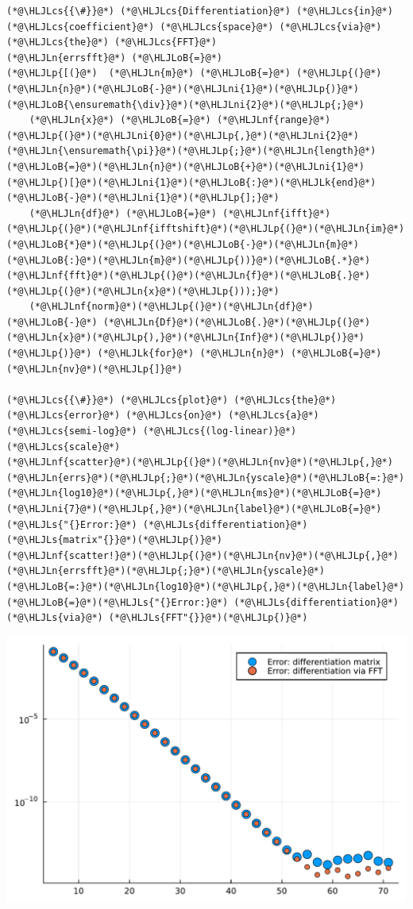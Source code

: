 \documentclass[12pt,landscape]{article}
\newcommand{\HLJLk}[1]{\textcolor[RGB]{148,91,176}{\textbf{#1}}}
\newcommand{\HLJLn}[1]{#1}
\newcommand{\HLJLnf}[1]{\textcolor[RGB]{66,102,213}{#1}}
\newcommand{\HLJLs}[1]{\textcolor[RGB]{201,61,57}{#1}}
\newcommand{\HLJLni}[1]{\textcolor[RGB]{59,151,46}{#1}}
\newcommand{\HLJLoB}[1]{\textcolor[RGB]{102,102,102}{\textbf{#1}}}
\newcommand{\HLJLp}[1]{#1}
\newcommand{\HLJLcs}[1]{\textcolor[RGB]{153,153,119}{\textit{#1}}}
\begin{document}
{\begin{lstlisting}
(*@\HLJLcs{{\#}}@*) (*@\HLJLcs{Differentiation}@*) (*@\HLJLcs{in}@*) (*@\HLJLcs{coefficient}@*) (*@\HLJLcs{space}@*) (*@\HLJLcs{via}@*) (*@\HLJLcs{the}@*) (*@\HLJLcs{FFT}@*)
(*@\HLJLn{errsfft}@*) (*@\HLJLoB{=}@*) 
(*@\HLJLp{[(}@*)  (*@\HLJLn{m}@*) (*@\HLJLoB{=}@*) (*@\HLJLp{(}@*)(*@\HLJLn{n}@*)(*@\HLJLoB{-}@*)(*@\HLJLni{1}@*)(*@\HLJLp{)}@*)(*@\HLJLoB{\ensuremath{\div}}@*)(*@\HLJLni{2}@*)(*@\HLJLp{;}@*)
    (*@\HLJLn{x}@*) (*@\HLJLoB{=}@*) (*@\HLJLnf{range}@*)(*@\HLJLp{(}@*)(*@\HLJLni{0}@*)(*@\HLJLp{,}@*)(*@\HLJLni{2}@*)(*@\HLJLn{\ensuremath{\pi}}@*)(*@\HLJLp{;}@*)(*@\HLJLn{length}@*)(*@\HLJLoB{=}@*)(*@\HLJLn{n}@*)(*@\HLJLoB{+}@*)(*@\HLJLni{1}@*)(*@\HLJLp{)[}@*)(*@\HLJLni{1}@*)(*@\HLJLoB{:}@*)(*@\HLJLk{end}@*)(*@\HLJLoB{-}@*)(*@\HLJLni{1}@*)(*@\HLJLp{];}@*)
    (*@\HLJLn{df}@*) (*@\HLJLoB{=}@*) (*@\HLJLnf{ifft}@*)(*@\HLJLp{(}@*)(*@\HLJLnf{ifftshift}@*)(*@\HLJLp{(}@*)(*@\HLJLn{im}@*)(*@\HLJLoB{*}@*)(*@\HLJLp{(}@*)(*@\HLJLoB{-}@*)(*@\HLJLn{m}@*)(*@\HLJLoB{:}@*)(*@\HLJLn{m}@*)(*@\HLJLp{))}@*)(*@\HLJLoB{.*}@*)(*@\HLJLnf{fft}@*)(*@\HLJLp{(}@*)(*@\HLJLn{f}@*)(*@\HLJLoB{.}@*)(*@\HLJLp{(}@*)(*@\HLJLn{x}@*)(*@\HLJLp{)));}@*)
    (*@\HLJLnf{norm}@*)(*@\HLJLp{(}@*)(*@\HLJLn{df}@*) (*@\HLJLoB{-}@*) (*@\HLJLn{Df}@*)(*@\HLJLoB{.}@*)(*@\HLJLp{(}@*)(*@\HLJLn{x}@*)(*@\HLJLp{),}@*)(*@\HLJLn{Inf}@*)(*@\HLJLp{)}@*) (*@\HLJLp{)}@*) (*@\HLJLk{for}@*) (*@\HLJLn{n}@*) (*@\HLJLoB{=}@*) (*@\HLJLn{nv}@*)(*@\HLJLp{]}@*)

(*@\HLJLcs{{\#}}@*) (*@\HLJLcs{plot}@*) (*@\HLJLcs{the}@*) (*@\HLJLcs{error}@*) (*@\HLJLcs{on}@*) (*@\HLJLcs{a}@*) (*@\HLJLcs{semi-log}@*) (*@\HLJLcs{(log-linear)}@*) (*@\HLJLcs{scale}@*)
(*@\HLJLnf{scatter}@*)(*@\HLJLp{(}@*)(*@\HLJLn{nv}@*)(*@\HLJLp{,}@*)(*@\HLJLn{errs}@*)(*@\HLJLp{;}@*)(*@\HLJLn{yscale}@*)(*@\HLJLoB{=:}@*)(*@\HLJLn{log10}@*)(*@\HLJLp{,}@*)(*@\HLJLn{ms}@*)(*@\HLJLoB{=}@*)(*@\HLJLni{7}@*)(*@\HLJLp{,}@*)(*@\HLJLn{label}@*)(*@\HLJLoB{=}@*)(*@\HLJLs{"{}Error:}@*) (*@\HLJLs{differentiation}@*) (*@\HLJLs{matrix"{}}@*)(*@\HLJLp{)}@*)
(*@\HLJLnf{scatter!}@*)(*@\HLJLp{(}@*)(*@\HLJLn{nv}@*)(*@\HLJLp{,}@*)(*@\HLJLn{errsfft}@*)(*@\HLJLp{;}@*)(*@\HLJLn{yscale}@*)(*@\HLJLoB{=:}@*)(*@\HLJLn{log10}@*)(*@\HLJLp{,}@*)(*@\HLJLn{label}@*)(*@\HLJLoB{=}@*)(*@\HLJLs{"{}Error:}@*) (*@\HLJLs{differentiation}@*) (*@\HLJLs{via}@*) (*@\HLJLs{FFT"{}}@*)(*@\HLJLp{)}@*)
\end{lstlisting}

\includegraphics[width=\linewidth]{jl_qsW2Qg/Fourier_12_1.pdf}

}
\end{document}
